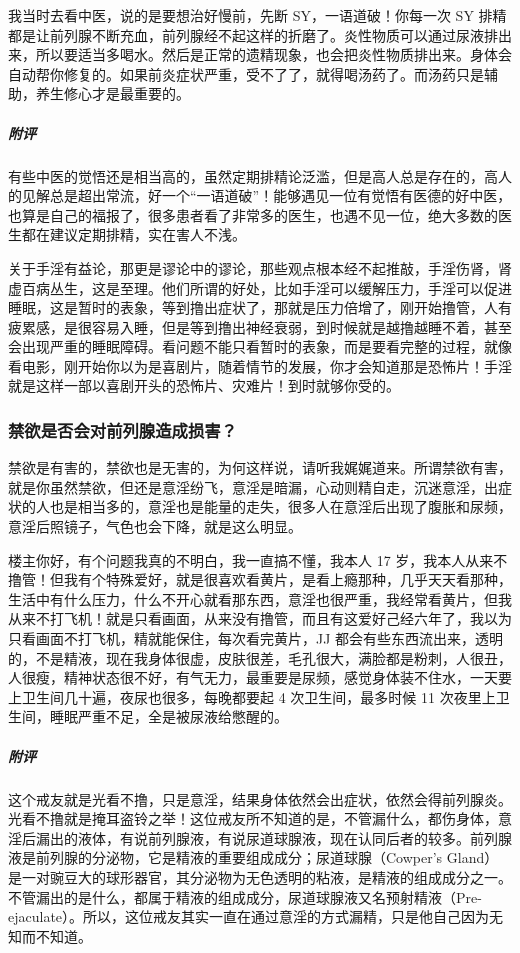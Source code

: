 \begin{case}[定期排精论]
    我当时去看中医，说的是要想治好慢前，先断 SY，一语道破！你每一次 SY 排精都是让前列腺不断充血，前列腺经不起这样的折磨了。炎性物质可以通过尿液排出来，所以要适当多喝水。然后是正常的遗精现象，也会把炎性物质排出来。身体会自动帮你修复的。如果前炎症状严重，受不了了，就得喝汤药了。而汤药只是辅助，养生修心才是最重要的。
    \subparagraph{附评} 有些中医的觉悟还是相当高的，虽然定期排精论泛滥，但是高人总是存在的，高人的见解总是超出常流，好一个“一语道破”！能够遇见一位有觉悟有医德的好中医，也算是自己的福报了，很多患者看了非常多的医生，也遇不见一位，绝大多数的医生都在建议定期排精，实在害人不浅。
\end{case}

关于手淫有益论，那更是谬论中的谬论，那些观点根本经不起推敲，手淫伤肾，肾虚百病丛生，这是至理。他们所谓的好处，比如手淫可以缓解压力，手淫可以促进睡眠，这是暂时的表象，等到撸出症状了，那就是压力倍增了，刚开始撸管，人有疲累感，是很容易入睡，但是等到撸出神经衰弱，到时候就是越撸越睡不着，甚至会出现严重的睡眠障碍。看问题不能只看暂时的表象，而是要看完整的过程，就像看电影，刚开始你以为是喜剧片，随着情节的发展，你才会知道那是恐怖片！手淫就是这样一部以喜剧开头的恐怖片、灾难片！到时就够你受的。

\subsubsection{禁欲是否会对前列腺造成损害？}

禁欲是有害的，禁欲也是无害的，为何这样说，请听我娓娓道来。所谓禁欲有害，就是你虽然禁欲，但还是意淫纷飞，意淫是暗漏，心动则精自走，沉迷意淫，出症状的人也是相当多的，意淫也是能量的走失，很多人在意淫后出现了腹胀和尿频，意淫后照镜子，气色也会下降，就是这么明显。

\begin{case}[禁欲有害]
    楼主你好，有个问题我真的不明白，我一直搞不懂，我本人 17 岁，我本人从来不撸管！但我有个特殊爱好，就是很喜欢看黄片，是看上瘾那种，几乎天天看那种，生活中有什么压力，什么不开心就看那东西，意淫也很严重，我经常看黄片，但我从来不打飞机！就是只看画面，从来没有撸管，而且有这爱好己经六年了，我以为只看画面不打飞机，精就能保住，每次看完黄片，JJ 都会有些东西流出来，透明的，不是精液，现在我身体很虚，皮肤很差，毛孔很大，满脸都是粉刺，人很丑，人很瘦，精神状态很不好，有气无力，最重要是尿频，感觉身体装不住水，一天要上卫生间几十遍，夜尿也很多，每晚都要起 4 次卫生间，最多时候 11 次夜里上卫生间，睡眠严重不足，全是被尿液给憋醒的。
    \subparagraph{附评} 这个戒友就是光看不撸，只是意淫，结果身体依然会出症状，依然会得前列腺炎。光看不撸就是掩耳盗铃之举！这位戒友所不知道的是，不管漏什么，都伤身体，意淫后漏出的液体，有说前列腺液，有说尿道球腺液，现在认同后者的较多。前列腺液是前列腺的分泌物，它是精液的重要组成成分；尿道球腺（Cowper's Gland）是一对豌豆大的球形器官，其分泌物为无色透明的粘液，是精液的组成成分之一。不管漏出的是什么，都属于精液的组成成分，尿道球腺液又名预射精液（Pre-ejaculate）。所以，这位戒友其实一直在通过意淫的方式漏精，只是他自己因为无知而不知道。
\end{case}

